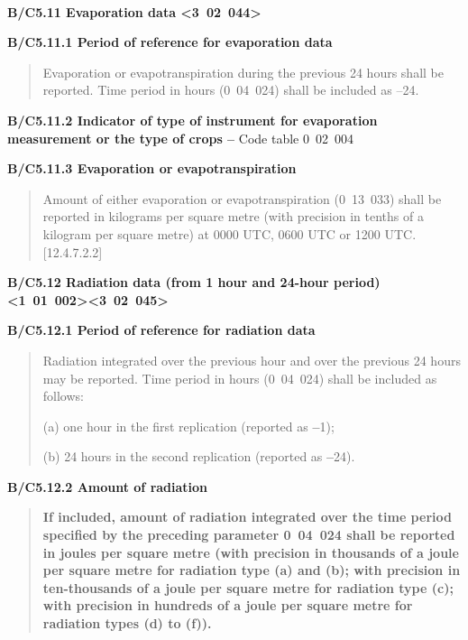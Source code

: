 \textbf{\\
}

\textbf{B/C5.11 Evaporation data \textless3~02~044\textgreater{}}

\textbf{B/C5.11.1 Period of reference for evaporation data}

\begin{quote}
Evaporation or evapotranspiration during the previous 24 hours shall be reported. Time period in hours (0~04~024) shall be included as --24.
\end{quote}

\textbf{B/C5.11.2 Indicator of type of instrument for evaporation measurement or the type of crops --} Code table 0~02~004

\textbf{B/C5.11.3 Evaporation or evapotranspiration}

\begin{quote}
Amount of either evaporation or evapotranspiration (0~13~033) shall be reported in kilograms per square metre (with precision in tenths of a kilogram per square metre) at 0000 UTC, 0600 UTC or 1200 UTC. {[}12.4.7.2.2{]}
\end{quote}

\textbf{B/C5.12 Radiation data (from 1 hour and 24-hour period) \textless1~01~002\textgreater\textless3~02~045\textgreater{}}

\textbf{B/C5.12.1 Period of reference for radiation data}

\begin{quote}
Radiation integrated over the previous hour and over the previous 24 hours may be reported. Time period in hours (0~04~024) shall be included as follows:

(a) one hour in the first replication (reported as \textbf{--}1);

(b) 24 hours in the second replication (reported as \textbf{--}24).
\end{quote}

\textbf{B/C5.12.2 Amount of radiation}

\begin{quote}
\textbf{If included, amount of radiation integrated over the time period specified by the preceding parameter 0~04~024 shall be reported in joules per square metre (with precision in thousands of a joule per square metre for radiation type (a) and (b); with precision in ten-thousands of a joule per square metre for radiation type (c); with precision in hundreds of a joule per square metre for radiation types (d) to (f)).}
\end{quote}

